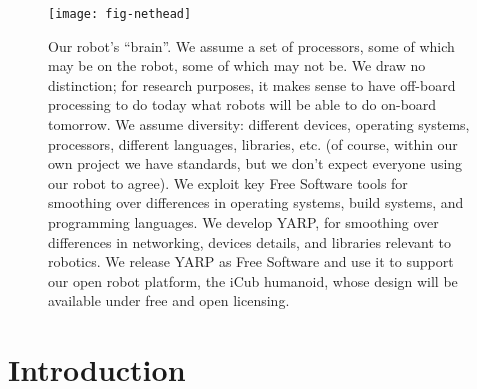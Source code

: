 

\begin{figure}
\centerline{
\texttt{[image: fig-nethead]}
}
\caption{
%
Our robot's ``brain''.
We assume a set of processors, some of which may
be on the robot, some of which may not be. We draw no 
distinction; for research purposes, it makes sense to
have off-board processing to do today what robots will
be able to do on-board tomorrow.
%
We assume diversity:
different devices, operating systems, processors, different languages,
libraries, etc. (of course, within our own project we have standards,
but we don't expect everyone using our robot to agree).
%
%
We exploit key Free Software tools for smoothing over differences in
operating systems, build systems, and programming languages.
%
We develop YARP, for smoothing over differences in networking,
devices details, and libraries relevant to robotics.
%
%
%
%
We release YARP as Free Software
 and use it to support our open robot
platform, the iCub humanoid, whose design will be available under free
and open licensing.
%
}
\end{figure}


\section{Introduction}




